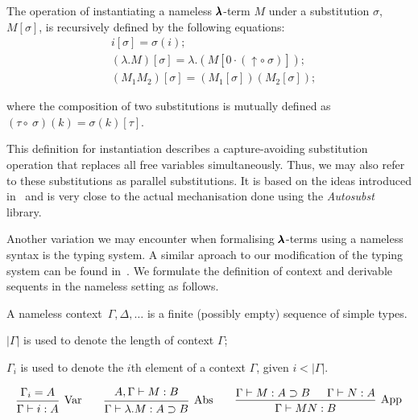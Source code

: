 \begin{definition}
  The operation of instantiating a nameless $\pmb{\lambda}$-term $M$ under a substitution $\sigma$, $M[\sigma]$, is recursively defined by the following equations:
  \begin{align*}
    & i[\sigma] = \sigma(i); \\
    & (\lambda . M)[\sigma] = \lambda . (M[0 \cdot (\uparrow \circ \ \sigma)]); \\
    & (M_1 M_2)[\sigma] = (M_1[\sigma]) (M_2[\sigma]);
  \end{align*}

  where the composition of two substitutions is mutually defined as $(\tau \circ \ \sigma)(k) = \sigma(k)[\tau]$.
\end{definition}

This definition for instantiation describes a capture-avoiding substitution operation that replaces all free variables simultaneously.
Thus, we may also refer to these substitutions as parallel substitutions.
It is based on the ideas introduced in~\cite{AutosubstSchafer} and is very close to the actual mechanisation done using the \textit{Autosubst} library.

Another variation we may encounter when formalising $\pmb{\lambda}$-terms using a nameless syntax is the typing system.
A similar aproach to our modification of the typing system can be found in~\cite[Chapter~7]{AndrewAdams}.
We formulate the definition of context and derivable sequents in the nameless setting as follows.

\begin{definition}
  A nameless context~$\Gamma, \Delta, \dots$ is a finite (possibly empty) sequence of simple types.
\end{definition}

\begin{notation} \hfill
  
  $| \Gamma |$ is used to denote the length of context $\Gamma$;

  $\Gamma_i$ is used to denote the $i$th element of a context $\Gamma$, given $i < | \Gamma |$.
\end{notation}

\begin{definition}
  \label{nameless_typing_rules}
  \[
    \begin{prooftree}
      \hypo{ \Gamma_i = A }
      \infer1[Var]{ \Gamma \vdash i:A } 
    \end{prooftree}
    \qquad
    \begin{prooftree}
      \hypo{ A, \Gamma \vdash M:B }
      \infer1[Abs]{ \Gamma \vdash \lambda . M : A \supset B  } 
    \end{prooftree}
    \qquad
    \begin{prooftree}
      \hypo{ \Gamma \vdash M : A \supset B }
      \hypo{ \Gamma \vdash N : A }	
      \infer2[App]{ \Gamma \vdash M N : B } 
    \end{prooftree}
  \]
\end{definition}

